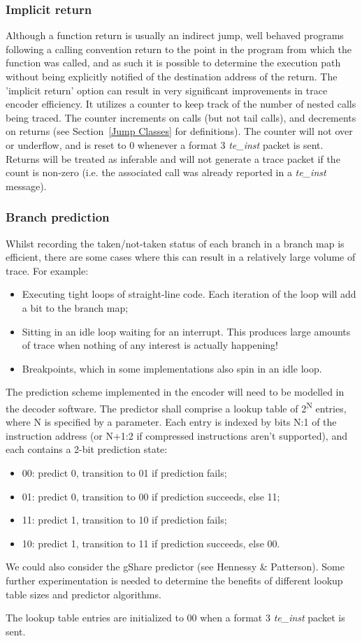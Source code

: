 \subsubsection{Implicit return} \label{sec:implicit-return}

Although a function return is usually an indirect jump, well behaved programs following a 
calling convention return to the point in the program from which the function was called, 
and as such it is possible to determine the execution path without being explicitly notified 
of the destination address of the return.  The 'implicit return' option can result in very 
significant improvements in trace encoder efficiency.  It utilizes a counter to 
keep track of the number of nested calls being traced.  The counter increments on calls (but not tail calls),
and decrements on returns (see Section~\ref{Jump Classes} for definitions).  The counter will not 
over or underflow, and is reset to 0 whenever a format 3 \textit{te\_inst} packet is sent.  Returns will be 
treated as inferable and will not generate a trace packet if the count is non-zero (i.e. the associated call 
was already reported in a \textit{te\_inst} message).

\subsubsection{Branch prediction} \label{sec:branch-prediction}

Whilst recording the taken/not-taken status of each branch in a branch map is efficient, there are 
some cases where this can result in a relatively large volume of trace.  For example:

\begin{itemize}
  \item Executing tight loops of straight-line code.  Each iteration of the loop will add a bit to the branch map;
  \item Sitting in an idle loop waiting for an interrupt.  This produces large amounts of trace when nothing of 
  any interest is actually happening!  
  \item Breakpoints, which in some implementations also spin in an idle loop.
\end{itemize}

The prediction scheme implemented in the encoder will need to be modelled in the decoder software.  
The predictor shall comprise a lookup table of 2\textsuperscript{N} entries, where N is specified by a parameter.  
Each entry is indexed by bits N:1 of the instruction address (or N+1:2 if compressed instructions aren't supported), 
and each contains a 2-bit prediction state:
\begin{itemize}
  \item 00: predict 0, transition to 01 if prediction fails;
  \item 01: predict 0, transition to 00 if prediction succeeds, else 11;
  \item 11: predict 1, transition to 10 if prediction fails;
  \item 10: predict 1, transition to 11 if prediction succeeds, else 00.
\end{itemize}

We could also consider the gShare predictor (see Hennessy \& Patterson).  Some further experimentation is needed
to determine the benefits of different lookup table sizes and predictor algorithms.

The lookup table entries are initialized to 00 when a format 3 \textit{te\_inst} packet is sent.


